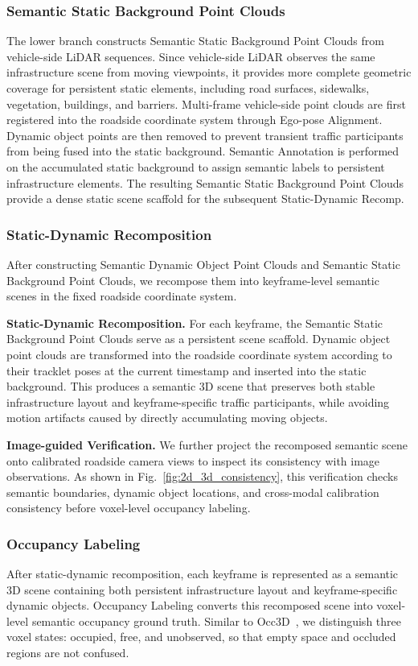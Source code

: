 \subsubsection{Semantic Static Background Point Clouds}
The lower branch constructs Semantic Static Background Point Clouds from
vehicle-side LiDAR sequences. Since vehicle-side LiDAR observes the same
infrastructure scene from moving viewpoints, it provides more complete
geometric coverage for persistent static elements, including road surfaces,
sidewalks, vegetation, buildings, and barriers. Multi-frame vehicle-side point
clouds are first registered into the roadside coordinate system through
Ego-pose Alignment. Dynamic object points are then removed to prevent transient
traffic participants from being fused into the static background.
Semantic Annotation is performed on the accumulated static background to assign
semantic labels to persistent infrastructure elements. The resulting Semantic
Static Background Point Clouds provide a dense static scene scaffold for the
subsequent Static-Dynamic Recomp.


\subsubsection{Static-Dynamic Recomposition}
After constructing Semantic Dynamic Object Point Clouds and Semantic Static
Background Point Clouds, we recompose them into keyframe-level semantic scenes
in the fixed roadside coordinate system.

\noindent\textbf{Static-Dynamic Recomposition.}
For each keyframe, the Semantic Static Background Point Clouds serve as a
persistent scene scaffold. Dynamic object point clouds are transformed into the
roadside coordinate system according to their tracklet poses at the current
timestamp and inserted into the static background. This produces a semantic 3D
scene that preserves both stable infrastructure layout and keyframe-specific
traffic participants, while avoiding motion artifacts caused by directly
accumulating moving objects.

\noindent\textbf{Image-guided Verification.}
We further project the recomposed semantic scene onto calibrated roadside
camera views to inspect its consistency with image observations. As shown in
Fig.~\ref{fig:2d_3d_consistency}, this verification checks semantic boundaries,
dynamic object locations, and cross-modal calibration consistency before
voxel-level occupancy labeling.


\subsubsection{Occupancy Labeling}
After static-dynamic recomposition, each keyframe is represented as a semantic
3D scene containing both persistent infrastructure layout and keyframe-specific
dynamic objects. Occupancy Labeling converts this recomposed scene into
voxel-level semantic occupancy ground truth. Similar to Occ3D~\cite{Occ3D}, we
distinguish three voxel states: occupied, free, and unobserved, so that empty
space and occluded regions are not confused.

